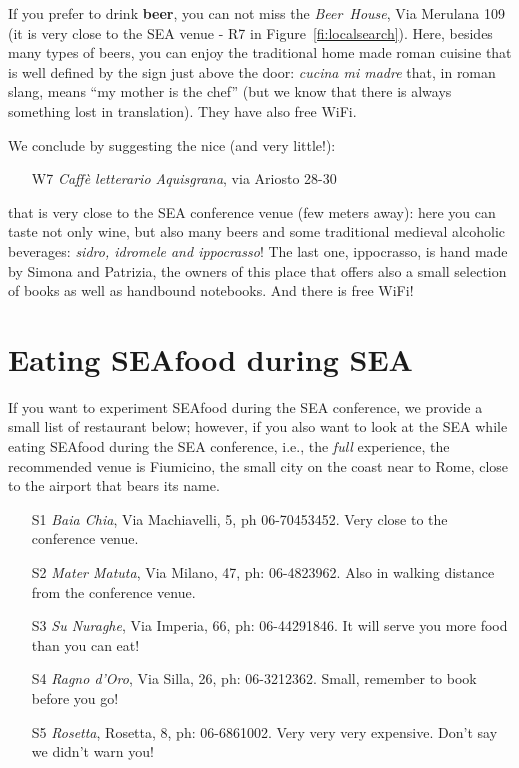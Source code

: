 \documentclass[twocolumn,10pt]{article}
\newcommand{\conference}{SEA\xspace}
\begin{document}
If you prefer to drink \textbf{beer}, you can not miss the \emph{Beer~House}, Via Merulana 109 (it is very close to the \conference venue - R7 in Figure~\ref{fi:localsearch}). Here, besides many types of beers, you can enjoy the traditional home made roman cuisine that is well defined by the sign just above the door: \emph{cucina mi madre} that, in roman slang, means ``my mother is the chef'' (but we know that there is always something lost in translation). They have also free WiFi. 

We conclude by suggesting the nice (and very little!):
\begin{enumerate}
\item[W7] \emph{Caff\`e letterario Aquisgrana}, via Ariosto 28-30 
\end{enumerate}
that is very close to the \conference conference venue (few meters away): here you can taste not only wine, but also many beers and some traditional medieval alcoholic beverages: \emph{sidro, idromele and ippocrasso}! The last one, ippocrasso, is hand made by Simona and Patrizia, the owners of this place that offers also a small selection of books as well as handbound notebooks. And there is free WiFi!

\section{Eating SEAfood during \conference}

If you want to experiment SEAfood during the SEA conference, we provide a small list of restaurant below; however, if you also want to look at the SEA while eating SEAfood during the SEA conference, i.e., the \emph{full} experience, the recommended venue is Fiumicino, the small city on the coast near to Rome, close to the airport that bears its name. 

\begin{enumerate}
\item[S1] \emph{Baia Chia}, Via Machiavelli, 5, ph 06-70453452. Very close to the conference venue.
\item[S2] \emph{Mater Matuta},  Via Milano, 47, ph: 06-4823962. Also in walking distance from the conference venue.
\item[S3] \emph{Su Nuraghe}, Via Imperia, 66, ph: 06-44291846. It will serve you more food than you can eat!
\item[S4] \emph{Ragno d'Oro}, Via Silla, 26, ph: 06-3212362. Small, remember to book before you go!
\item[S5] \emph{Rosetta}, Rosetta, 8, ph: 06-6861002. Very very very expensive.  Don't say we didn't warn you!
\end{enumerate}
\end{document}
